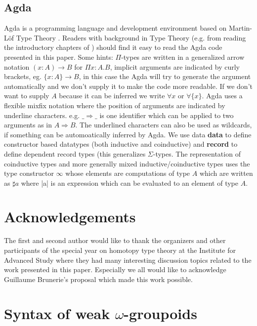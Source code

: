 \documentclass{acm_proc_article-sp}
\begin{document}
\subsection*{Agda}\label{Agda}

Agda is a programming language and development environment based on
Martin-Löf Type Theory \cite{agdawiki:main}. Readers with background in
Type Theory (e.g. from reading the introductory chapters of
\cite{hott}) should find it easy to read the Agda code presented
in this paper. Some hints: $\Pi$-types are written in a generalized
arrow notation $(x : A) → B$ for $\Pi x:A.B$, implicit arguments are
indicated by curly brackets, eg. $\{x : A\} → B$, in this case the Agda
will try to generate the argument automatically and we don't supply it
to make the code more readable. If we don't want to supply $A$ because
it can be inferred we write $\forall x$ or $\forall\{x\}$.
Agda uses a flexible mixfix notation
where the position of arguments are indicated by underline characters.
e.g. $\_⇒\_$ is one identifier which can be applied to two arguments as
in $A ⇒ B$. The underlined characters can also be used as wildcards, if something can be automoatically inferred by Agda.
We use data \textbf{data} to define constructor based datatypes (both
inductive and coinductive) and \textbf{record} to define dependent record
types (this generalizes $\Sigma$-types. The representation of
coinductive types and more generally mixed inductive/coinductive types
\cite{txa:mpc2010g}
uses the type constructor $\infty$ whose elements are computations of type
$A$ which are written as $\sharp a$ where |a| is an expression which can be
evaluated to an element of type $A$.

\section*{Acknowledgements}

The first and second author would like to thank the organizers and
other participants of the special year on homotopy type theory at the
Institute for Advanced Study where they had many interesting
discussion topics related to the work presented in this
paper. Especially we all would like to acknowledge Guillaume
Brunerie's proposal which made this work possible. 




\section{Syntax of weak $\omega$-groupoids}\label{sec:syntax}
\end{document}
